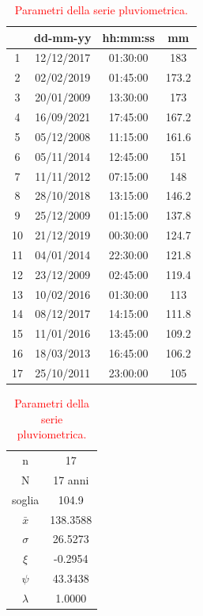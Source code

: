 \begin{table}[H]
    \begin{minipage}{.5\linewidth}
      \caption{\textcolor{red}{Campione della serie pluviometrica.}}
      \centering
        \begin{tabular}{cccc}
            \toprule
            & dd-mm-yy   & hh:mm:ss & mm  \\
         \midrule
         1  & 12/12/2017 & 01:30:00 & 183   \\
         2  & 02/02/2019 & 01:45:00 & 173.2 \\
         3  & 20/01/2009 & 13:30:00 & 173   \\
         4  & 16/09/2021 & 17:45:00 & 167.2 \\
         5  & 05/12/2008 & 11:15:00 & 161.6 \\
         6  & 05/11/2014 & 12:45:00 & 151   \\
         7  & 11/11/2012 & 07:15:00 & 148   \\
         8  & 28/10/2018 & 13:15:00 & 146.2 \\
         9  & 25/12/2009 & 01:15:00 & 137.8 \\
         10 & 21/12/2019 & 00:30:00 & 124.7 \\
         11 & 04/01/2014 & 22:30:00 & 121.8 \\
         12 & 23/12/2009 & 02:45:00 & 119.4 \\
         13 & 10/02/2016 & 01:30:00 & 113   \\
         14 & 08/12/2017 & 14:15:00 & 111.8 \\
         15 & 11/01/2016 & 13:45:00 & 109.2 \\
         16 & 18/03/2013 & 16:45:00 & 106.2 \\
         17 & 25/10/2011 & 23:00:00 & 105   \\
         \bottomrule
        \end{tabular}
    \end{minipage}%
    \begin{minipage}{.5\linewidth}
      \centering
        \caption{\textcolor{red}{Parametri della serie pluviometrica.}}
        \begin{tabular}{cc}
            \toprule
            n        &   17      \\
            N        & 17 anni \\
            soglia   &     104.9    \\
            $\bar{x}$ &    138.3588    \\
            $\sigma$ &      26.5273   \\
            $\xi$      &     -0.2954  \\
            $\psi$      &    43.3438 \\
            $\lambda$   &   1.0000 \\
        \bottomrule     
        \end{tabular}
    \end{minipage} 
\end{table}

